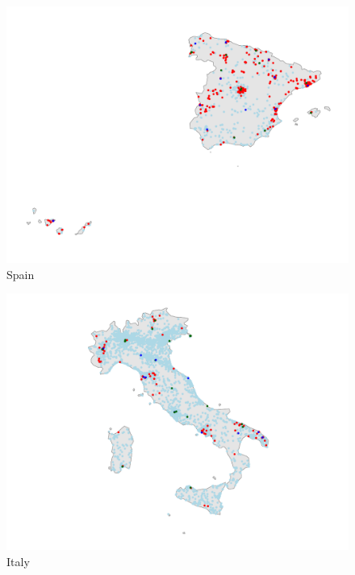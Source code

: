 \documentclass[12pt]{report}
\begin{document}
\newpage
\begin{figure}
    \centering
    \includegraphics[width=.95\textheight,trim={0cm 0cm 0cm 0.5cm},clip]{../Output/ES_map.pdf}
    \caption{Spain}
    \label{fig:map_obs_ES}
\end{figure}

\newpage
\begin{figure}[ht]
    \centering
    \includegraphics[width=.9\textheight,trim={2.8cm 0cm 2.5cm 0.5cm},clip]{../Output/IT_map.pdf}
    \caption{Italy}
    \label{fig:map_obs_IT_1}
\end{figure}
\end{document}
